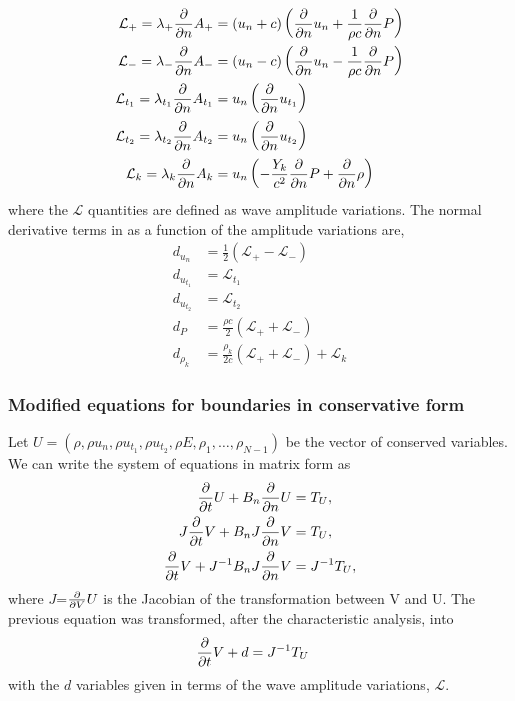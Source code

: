 %
\begin{align}
 \mathcal{L}_+     = \lambda_+     \frac{\partial }{\partial n}A_+    &= (u_n+c) \left(\frac{\partial }{\partial n}u_n +\frac{1}{\rho c} \frac{\partial }{\partial n}P \right) \\
 \mathcal{L}_-     = \lambda_-     \frac{\partial }{\partial n}A_-    &= (u_n-c) \left(\frac{\partial }{\partial n}u_n -\frac{1}{\rho c} \frac{\partial }{\partial n}P \right) \\
 \mathcal{L}_{t_1} = \lambda_{t_1} \frac{\partial }{\partial n}A_{t_1} &= u_n \left(\frac{\partial }{\partial n}u_{t_1} \right) \\
 \mathcal{L}_{t_2} = \lambda_{t_2} \frac{\partial }{\partial n}A_{t_2} &= u_n \left(\frac{\partial }{\partial n}u_{t_2} \right) \\
 \mathcal{L}_k     = \lambda_k     \frac{\partial }{\partial n}A_k    &= u_n \left(-\frac{Y_k}{c^2} \frac{\partial }{\partial n}P +\frac{\partial }{\partial n}\rho \right)
\end{align}
%
where the $\mathcal{L}$ quantities are defined as wave amplitude variations. The
normal derivative terms in as a function of the amplitude variations are,
%
\begin{align}
 d_{u_n}     &= \frac{1}{2} \left(\mathcal{L}_+ - \mathcal{L}_- \right) \\
 d_{u_{t_1}} &= \mathcal{L}_{t_1} \\
 d_{u_{t_2}} &= \mathcal{L}_{t_2} \\
 d_P         &= \frac{\rho c}{2}   \left(\mathcal{L}_+ + \mathcal{L}_- \right) \\
 d_{\rho_k}  &= \frac{\rho_k}{2 c} \left(\mathcal{L}_+ + \mathcal{L}_- \right) + \mathcal{L}_k 
\end{align}
%

\subsubsection{Modified equations for boundaries in conservative form}
Let $U=(\rho, \rho u_n, \rho u_{t_1}, \rho u_{t_2}, \rho E, \rho_1, \ldots,
\rho_{N-1})$ be the vector of conserved variables. We can write the system of
equations in matrix form as
%
\begin{align}
  \frac{\partial }{\partial t}U
  + B_n \frac{\partial }{\partial n}U
  &= T_U, \\
  J \frac{\partial }{\partial t}V
  + B_n J \frac{\partial }{\partial n}V
  &= T_U, \\
  \frac{\partial }{\partial t}V
  + J^{-1} B_n J \frac{\partial }{\partial n}V
  &= J^{-1} T_U, \\
\end{align}
%
where $J$=$\frac{\partial }{\partial V}U$ is the Jacobian of the transformation between V and U.
The previous equation was transformed, after the characteristic analysis, into
%
\begin{align}
  \frac{\partial }{\partial t}V
  + d
  &= J^{-1} T_U
\end{align}
%
with the $d$ variables given in terms of the wave amplitude variations,
$\mathcal{L}$.

